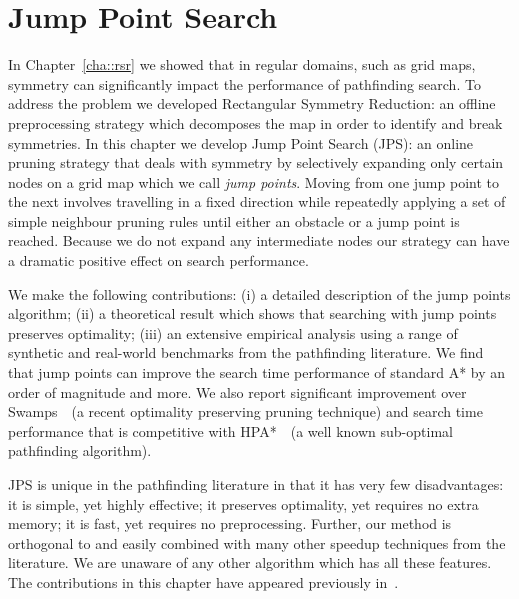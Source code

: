 \chapter{Jump Point Search}
\label{cha::jps}
In Chapter~\ref{cha::rsr} we showed that in regular domains, such as grid maps,
symmetry can significantly impact the performance of pathfinding search.
 To address the problem we developed Rectangular Symmetry Reduction:
 an offline preprocessing strategy which decomposes the map in order to 
identify and break symmetries.
 In this chapter we develop Jump Point Search 
(JPS): an online pruning strategy that
deals with symmetry by selectively expanding only certain nodes on a grid map
which we call \emph{jump points}.  
Moving from one jump point to the next
involves travelling in a fixed direction while repeatedly applying a set of
simple neighbour pruning rules until either an obstacle or a jump point is
reached.  Because we do not expand any intermediate nodes %
our strategy can have a dramatic positive effect on search performance.
\par
We make the following contributions: (i) a detailed description of the jump
points algorithm; (ii) a theoretical result which shows that searching with jump
points preserves optimality;  (iii) an extensive empirical analysis using
a range of synthetic and real-world benchmarks from the pathfinding literature.
We find that jump points can improve the search time performance of standard A* by
an order of magnitude and more.  We also report significant improvement over
Swamps~\citep{pochter10}~(a recent optimality preserving pruning technique) and
search time performance that is competitive with HPA*~\citep{botea04}~(a well known 
sub-optimal pathfinding algorithm).
\par
JPS is unique in the pathfinding literature in that it has very few
disadvantages: it is simple, yet highly effective; it preserves optimality, yet
requires no extra memory;  it is fast, yet requires no preprocessing.
Further, our method is orthogonal to and easily combined with 
many other speedup techniques from the literature.
We are unaware of any other algorithm which has all these features.
\\ \newline 
The contributions in this chapter have appeared previously in~\citep{harabor11b,harabor12}.
\newpage
